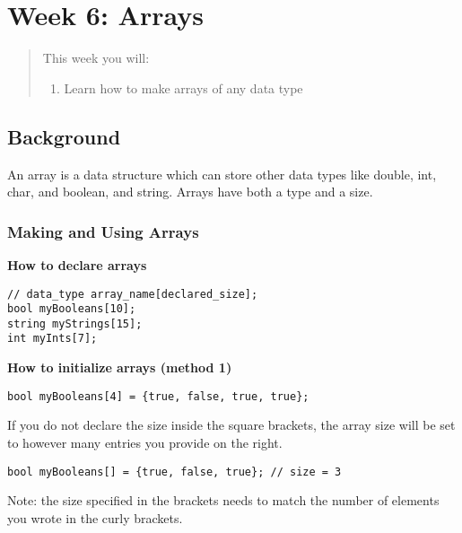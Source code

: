\chapter*{Week 6: Arrays}
\setcounter{chapter}{6}
\setcounter{section}{0}

\begin{abstract}
This week you will:
\begin{enumerate}
    \item Learn how to make arrays of any data type

\end{enumerate}
    
\end{abstract}

\section{Background}

An array is a data structure which can store other data types like double, int, char, and boolean, and string. Arrays have both a type and a size.

\subsection{Making and Using Arrays}

\textbf{How to declare arrays}
\begin{verbatim}
// data_type array_name[declared_size];
bool myBooleans[10];
string myStrings[15];
int myInts[7];
\end{verbatim}

\textbf{How to initialize arrays (method 1)}
\begin{verbatim}
bool myBooleans[4] = {true, false, true, true};
\end{verbatim}

If you do not declare the size inside the square brackets, the array size will be set to however many entries you provide on the right.

\begin{verbatim}
bool myBooleans[] = {true, false, true}; // size = 3
\end{verbatim}

Note: the size specified in the brackets needs to match the number of elements you wrote in the curly brackets.

